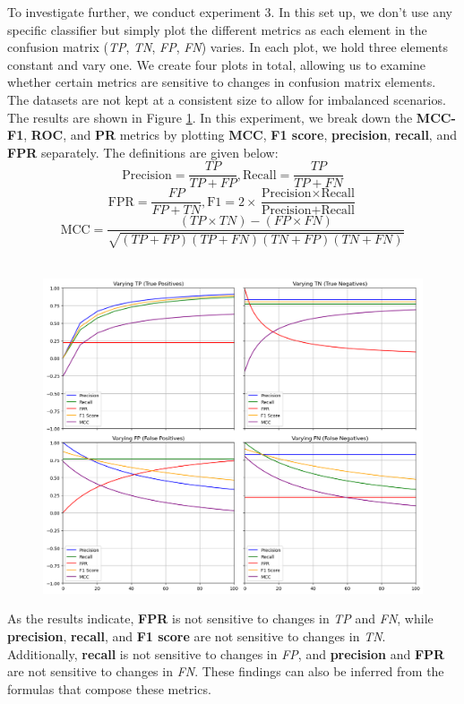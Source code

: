 \documentclass[12pt, oneside]{amsart}
\theoremstyle{definition}
\theoremstyle{remark}
\numberwithin{equation}{section}
\begin{document}
To investigate further, we conduct experiment 3. In this set up, we don't use any specific classifier but simply plot the different metrics as each element in the confusion matrix (\textit{TP}, \textit{TN}, \textit{FP}, \textit{FN}) varies. In each plot, we hold three elements constant and vary one. We create four plots in total, allowing us to examine whether certain metrics are sensitive to changes in confusion matrix elements. The datasets are not kept at a consistent size to allow for imbalanced scenarios. The results are shown in Figure \ref{simulation3}. In this experiment, we break down the \textbf{MCC-F1}, \textbf{ROC}, and \textbf{PR} metrics by plotting \textbf{MCC}, \textbf{F1 score}, \textbf{precision}, \textbf{recall}, and \textbf{FPR} separately. The definitions are given below: 
\[
\text{Precision} = \frac{TP}{TP + FP}, 
\text{Recall} = \frac{TP}{TP + FN}
\]
\[
\text{FPR} = \frac{FP}{FP + TN}, 
\text{F1} = 2 \times \frac{\text{Precision} \times \text{Recall}}{\text{Precision} + \text{Recall}}
\]
\[
\text{MCC} = \frac{(TP \times TN) - (FP \times FN)}{\sqrt{(TP + FP)(TP + FN)(TN + FP)(TN + FN)}}
\]
\\


\begin{figure}[hbt!]
    \centering
    \includegraphics[scale=0.33]{Report/Figure/simulation3.jpg}
    \caption{}
    \label{simulation3}
\end{figure}
\FloatBarrier

As the results indicate, \textbf{FPR} is not sensitive to changes in \textit{TP} and \textit{FN}, while \textbf{precision}, \textbf{recall}, and \textbf{F1 score} are not sensitive to changes in \textit{TN}. Additionally, \textbf{recall} is not sensitive to changes in \textit{FP}, and \textbf{precision} and \textbf{FPR} are not sensitive to changes in \textit{FN}. These findings can also be inferred from the formulas that compose these metrics.\\
\end{document}
